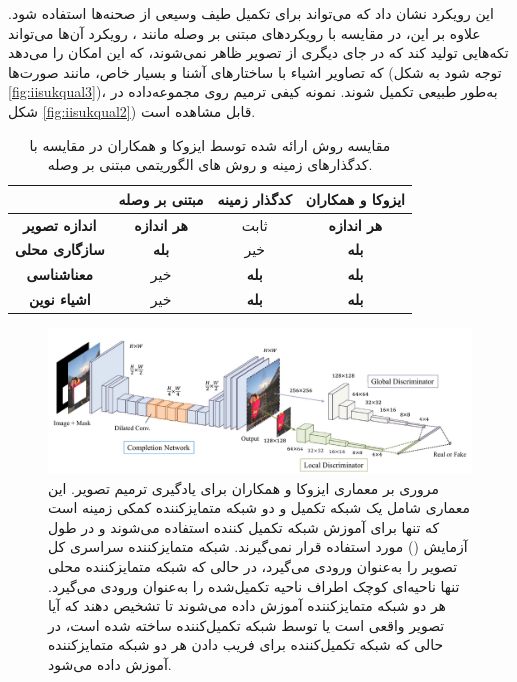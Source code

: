این رویکرد نشان داد که می‌تواند برای تکمیل طیف وسیعی از صحنه‌ها استفاده شود. علاوه بر این، در مقایسه با رویکردهای مبتنی بر وصله مانند ، رویکرد آن‌ها می‌تواند تکه‌هایی تولید کند که در جای دیگری از تصویر ظاهر نمی‌شوند، که این امکان را می‌دهد که تصاویر اشیاء با ساختارهای آشنا و بسیار خاص، مانند صورت‌ها (توجه شود به شکل \ref{fig:iisukqual3})، به‌طور طبیعی  تکمیل شوند. نمونه کیفی ترمیم روی مجموعه‌داده  در شکل  \ref{fig:iisukqual2}) قابل مشاهده است. \\

\begin{table}[ht]
	\centering
	\begin{tabular}{|c|c|c|c|}
		\hline
		\textbf{} & \textbf{مبتنی بر وصله} & \textbf{کدگذار زمینه} & \textbf{ایزوکا و همکاران} \\
		\hline
		\textbf{اندازه تصویر} & \textbf{هر اندازه} & ثابت & \textbf{هر اندازه} \\
		\hline
		\textbf{سازگاری محلی} & \textbf{بله} & خیر & \textbf{بله} \\
		\hline
		\textbf{معناشناسی} & خیر & \textbf{بله} & \textbf{بله} \\
		\hline
		\textbf{اشیاء نوین} & خیر & \textbf{بله} & \textbf{بله} \\
		\hline
	\end{tabular}
	\caption{مقایسه روش‌ ارائه شده توسط ایزوکا  و همکاران در مقایسه با کدگذارهای زمینه و روش های الگوریتمی مبتنی بر وصله.}
\end{table}


\begin{figure}
	\centering
	\includegraphics[width=1\linewidth]{IISUKAArch1}
	\caption{مروری بر معماری ایزوکا و همکاران برای یادگیری ترمیم تصویر. این معماری شامل یک شبکه تکمیل و دو شبکه متمایزکننده کمکی زمینه است که تنها برای آموزش شبکه تکمیل  کننده استفاده می‌شوند و در طول آزمایش ()
		 مورد استفاده قرار نمی‌گیرند. شبکه متمایزکننده سراسری کل تصویر را به‌عنوان ورودی می‌گیرد، در حالی که شبکه متمایزکننده محلی تنها ناحیه‌ای کوچک اطراف ناحیه تکمیل‌شده را به‌عنوان ورودی می‌گیرد. هر دو شبکه متمایزکننده آموزش داده می‌شوند تا تشخیص دهند که آیا تصویر واقعی است یا توسط شبکه تکمیل‌کننده ساخته شده است، در حالی که شبکه تکمیل‌کننده برای فریب دادن هر دو شبکه متمایزکننده آموزش داده می‌شود.}
	\label{fig:iisukaarch1}
\end{figure}



